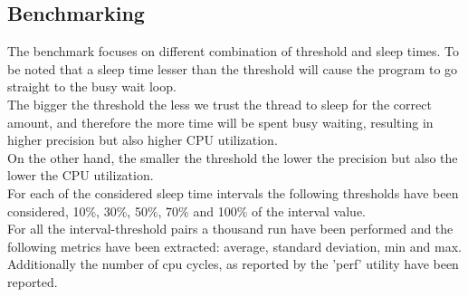 \documentclass{article}
\begin{document}
\subsection*{Benchmarking}
The benchmark focuses on different combination of threshold and sleep times. To be noted that a sleep time lesser than the threshold will cause the program to go straight to the busy wait loop.\\
The bigger the threshold the less we trust the thread to sleep for the correct amount, and therefore the more time will be spent busy waiting, resulting in higher precision but also higher CPU utilization.\\
On the other hand, the smaller the threshold the lower the precision but also the lower the CPU utilization.\\
For each of the considered sleep time intervals the following thresholds have been considered, 10\%, 30\%, 50\%, 70\% and 100\% of the interval value.\\
For all the interval-threshold pairs a thousand run have been performed and the following metrics have been extracted: average, standard deviation, min and max. Additionally the number of cpu cycles, as reported by the 'perf' utility have been reported.
\end{document}
